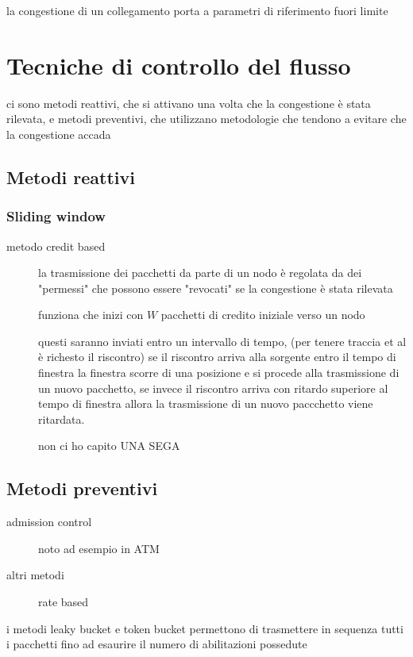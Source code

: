 \documentclass[11pt]{article}
\author{Biggie Dickus}
\date{\today}
\title{}
\begin{document}
\tableofcontents

la congestione di un collegamento porta a parametri di riferimento fuori limite

\section{Tecniche di controllo del flusso}
\label{sec:orgfcd789e}
ci sono metodi reattivi, che si attivano una volta che la congestione è stata rilevata, e metodi preventivi, che utilizzano metodologie che tendono a evitare che la congestione accada
\subsection{Metodi reattivi}
\label{sec:org0e89b14}
\subsubsection{Sliding window}
\label{sec:orge340e11}
\begin{description}
\item[{metodo credit based\footnotemark}] la trasmissione dei pacchetti da parte di un nodo è regolata da dei "permessi" che possono essere "revocati" se la congestione è stata rilevata

funziona che inizi con \(W\) pacchetti di credito iniziale verso un nodo

questi saranno inviati entro un intervallo di tempo, (per tenere traccia et al è richesto il riscontro)
se il riscontro arriva alla sorgente entro il tempo di finestra la finestra scorre di una posizione e si procede alla trasmissione di un nuovo pacchetto, se invece il riscontro arriva con ritardo superiore al tempo di finestra allora la trasmissione di un nuovo paccchetto viene ritardata.

non ci ho capito UNA SEGA
\end{description}
\subsection{Metodi preventivi}
\label{sec:orga3452fd}
\begin{description}
\item[{admission control}] noto ad esempio in ATM
\item[{altri metodi}] rate based
\end{description}

i metodi leaky bucket e token bucket permettono di trasmettere in sequenza tutti i pacchetti fino ad esaurire il numero di abilitazioni possedute
\end{document}

